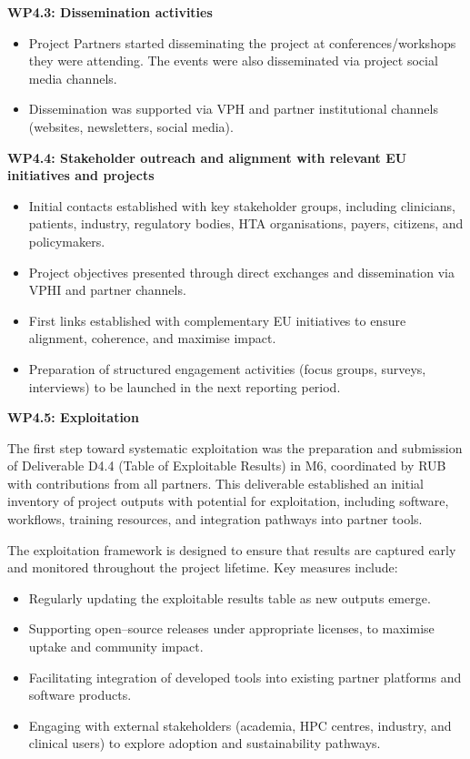 \documentclass[a4paper,12pt, numbers]{article}
\begin{document}
\noindent\textbf{WP4.3: Dissemination activities}

\begin{itemize}[left=1em, itemsep=0pt, topsep=0pt]
\item Project Partners started disseminating the project at conferences/workshops they were attending. The events were also disseminated via project social media channels. 
\item Dissemination was supported via VPH and partner institutional channels (websites, newsletters, social media).
\end{itemize}

\noindent\textbf{WP4.4: Stakeholder outreach and alignment with relevant EU initiatives and projects} %


\begin{itemize}[left=1em, itemsep=0pt, topsep=0pt]
\item Initial contacts established with key stakeholder groups, including clinicians, patients, industry, regulatory bodies, HTA organisations, payers, citizens, and policymakers.
\item Project objectives presented through direct exchanges and dissemination via VPHI and partner channels.
\item First links established with complementary EU initiatives to ensure alignment, coherence, and maximise impact.
\item Preparation of structured engagement activities (focus groups, surveys, interviews) to be launched in the next reporting period.
\end{itemize}



\noindent\textbf{WP4.5: Exploitation}

The first step toward systematic exploitation was the preparation and submission of Deliverable D4.4 (Table of Exploitable Results) in M6, coordinated by RUB with contributions from all partners. This deliverable established an initial inventory of project outputs with potential for exploitation, including software, workflows, training resources, and integration pathways into partner tools.  

The exploitation framework is designed to ensure that results are captured early and monitored throughout the project lifetime. Key measures include:  
\begin{itemize}[left=1em, itemsep=0pt, topsep=0pt]
\item Regularly updating the exploitable results table as new outputs emerge.  
\item Supporting open--source releases under appropriate licenses, to maximise uptake and community impact.  
\item Facilitating integration of developed tools into existing partner platforms and software products.  
\item Engaging with external stakeholders (academia, HPC centres, industry, and clinical users) to explore adoption and sustainability pathways.  
\end{itemize}
\end{document}
